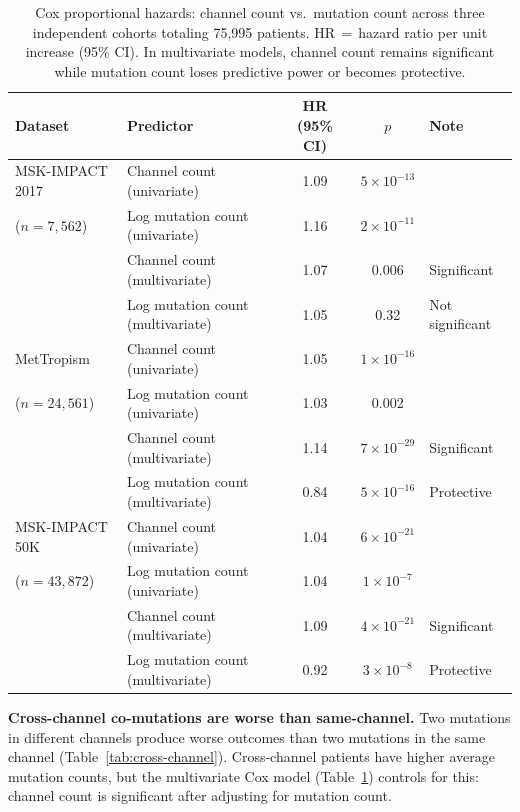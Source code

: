 \documentclass[11pt]{article}
\begin{document}
\begin{table}[ht]
\centering
\caption{Cox proportional hazards: channel count vs.\ mutation
count across three independent cohorts totaling 75{,}995 patients.
HR\,$=$\,hazard ratio per unit increase (95\% CI).
In multivariate models,
channel count remains significant while mutation count loses
predictive power or becomes protective.}
\label{tab:empirical}
\medskip
\begin{tabular*}{\textwidth}{@{\extracolsep{\fill}}llccl@{}}
\toprule
Dataset & Predictor & HR (95\% CI) & $p$ & Note \\
\midrule
MSK-IMPACT 2017 & Channel count (univariate) & 1.09 & $5 \times 10^{-13}$ & \\
\quad ($n=7{,}562$) & Log mutation count (univariate) & 1.16 & $2 \times 10^{-11}$ & \\
 & Channel count (multivariate) & 1.07 & 0.006 & Significant \\
 & Log mutation count (multivariate) & 1.05 & 0.32 & Not significant \\
\midrule
MetTropism & Channel count (univariate) & 1.05 & $1 \times 10^{-16}$ & \\
\quad ($n=24{,}561$) & Log mutation count (univariate) & 1.03 & 0.002 & \\
 & Channel count (multivariate) & 1.14 & $7 \times 10^{-29}$ & Significant \\
 & Log mutation count (multivariate) & 0.84 & $5 \times 10^{-16}$ & Protective \\
\midrule
MSK-IMPACT 50K & Channel count (univariate) & 1.04 & $6 \times 10^{-21}$ & \\
\quad ($n=43{,}872$) & Log mutation count (univariate) & 1.04 & $1 \times 10^{-7}$ & \\
 & Channel count (multivariate) & 1.09 & $4 \times 10^{-21}$ & Significant \\
 & Log mutation count (multivariate) & 0.92 & $3 \times 10^{-8}$ & Protective \\
\bottomrule
\end{tabular*}
\end{table}

\textbf{Cross-channel co-mutations are worse than same-channel.}
Two mutations in different channels produce worse outcomes than
two mutations in the same channel (Table~\ref{tab:cross-channel}).
Cross-channel patients have higher average mutation counts, but the
multivariate Cox model (Table~\ref{tab:empirical}) controls for
this: channel count is significant after adjusting for mutation
count.
\end{document}
